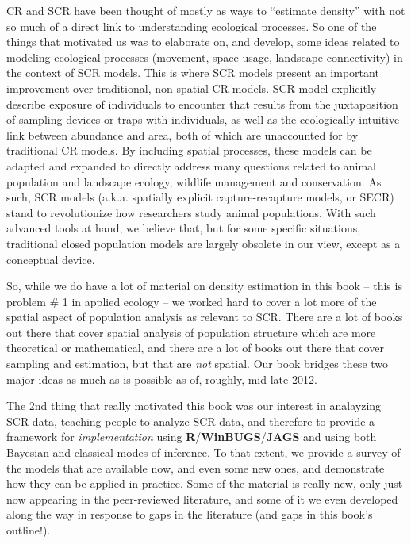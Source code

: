 CR and SCR have been thought of mostly as ways to ``estimate density''
with not so much of a direct link to understanding ecological
processes. So one of the things that motivated us was to elaborate on,
and develop, some ideas related to modeling ecological processes
(movement, space usage, landscape connectivity) in the context of SCR
models.  
 This is where SCR models
present an important improvement over traditional, non-spatial CR
models.  SCR model explicitly describe exposure of individuals to
encounter that results from the juxtaposition of sampling devices or
traps with individuals, as well as the ecologically intuitive link
between abundance and area, both of which are unaccounted for by
traditional CR models. By including spatial processes, these models
can be adapted and expanded to directly address many questions related
to animal population and landscape ecology, wildlife management and
conservation. 
As such, SCR models (a.k.a.  spatially explicit capture-recapture
models, or SECR) stand to revolutionize how
researchers study animal populations. 
With such advanced tools at hand,
we believe that, but for some specific situations, traditional closed
population models are largely obsolete in our view, except as a
conceptual device.

So, while we do have a lot of material on density estimation in this
book --
this is problem \# 1 in applied ecology -- we worked hard to cover a
lot more of the spatial aspect of population analysis as relevant to 
SCR.  There are a lot of books out there that cover spatial
analysis of population structure which are more theoretical or
mathematical, and there are a lot of books out there that cover
sampling and estimation, but that are {\it not} spatial. Our book
bridges these two major ideas as much as is possible as of, roughly,
mid-late 2012.

The 2nd thing that really motivated this book was our interest in
analayzing SCR data, teaching people to analyze SCR data, and
 therefore to provide a
framework for {\it implementation} using
\textbf{R}/\textbf{WinBUGS}/\textbf{JAGS} and using both Bayesian and
classical modes of inference.  To that extent, we provide a survey of
the models that are available now, and even some new ones, and
demonstrate how they can be applied in practice. Some of the material
is really new, only just now appearing in the peer-reviewed
literature, and some of it we even developed along the way in response to
gaps in the literature (and gaps in this book's outline!).

